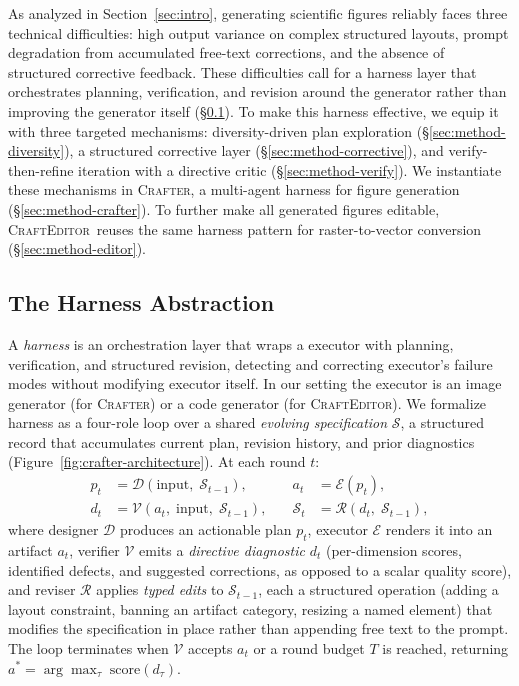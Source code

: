 \documentclass{article}
\newcommand{\Crafter}{\textsc{Crafter}\xspace}
\newcommand{\Editor}{\textsc{CraftEditor}\xspace}
\begin{document}
As analyzed in Section~\ref{sec:intro}, generating scientific figures
reliably faces three technical difficulties: high output variance on
complex structured layouts, prompt degradation from accumulated free-text
corrections, and the absence of structured corrective feedback. These
difficulties call for a harness layer that orchestrates planning,
verification, and revision around the generator rather than improving the
generator itself (\S\ref{sec:method-harness}). To make this harness
effective, we equip it with three targeted mechanisms:
diversity-driven plan exploration (\S\ref{sec:method-diversity}), a
structured corrective layer (\S\ref{sec:method-corrective}), and
verify-then-refine iteration with a directive critic
(\S\ref{sec:method-verify}). We instantiate these mechanisms in
\Crafter, a multi-agent harness for figure generation
(\S\ref{sec:method-crafter}). To further make all generated figures
editable, \Editor\ reuses the same harness pattern for raster-to-vector
conversion (\S\ref{sec:method-editor}).

\subsection{The Harness Abstraction}
\label{sec:method-harness}

A \emph{harness} is an orchestration layer that wraps a executor with planning, verification, and structured revision, detecting and correcting executor's failure modes without modifying executor itself. In our setting the executor is an image generator (for \Crafter) or a code generator (for \Editor).
We formalize harness as a four-role loop over a shared \emph{evolving specification} $\mathcal{S}$, a structured record that accumulates current plan, revision history, and prior diagnostics (Figure~\ref{fig:crafter-architecture}). At each round $t$:
%
\begin{align}
  p_t &= \mathcal{D}(\text{input},\;\mathcal{S}_{t-1}),
  &\quad a_t &= \mathcal{E}(p_t), \label{eq:harness-de}\\
  d_t &= \mathcal{V}(a_t,\;\text{input},\;\mathcal{S}_{t-1}),
  &\quad \mathcal{S}_t &= \mathcal{R}(d_t,\;\mathcal{S}_{t-1}),
  \label{eq:harness-vr}
\end{align}
%
where designer $\mathcal{D}$ produces an actionable plan $p_t$, executor $\mathcal{E}$ renders it into an artifact $a_t$, verifier $\mathcal{V}$ emits a \emph{directive diagnostic} $d_t$ (per-dimension scores, identified defects, and suggested corrections, as opposed to a scalar quality score), and reviser $\mathcal{R}$ applies \emph{typed edits} to $\mathcal{S}_{t-1}$, each a structured operation (adding a layout constraint, banning an artifact category, resizing a named element) that modifies the specification in place rather than appending free text to the prompt. The loop terminates when $\mathcal{V}$ accepts $a_t$ or a round budget $T$ is reached, returning $a^{*}\!=\!\arg\max_\tau\;\mathrm{score}(d_\tau)$.
\end{document}
